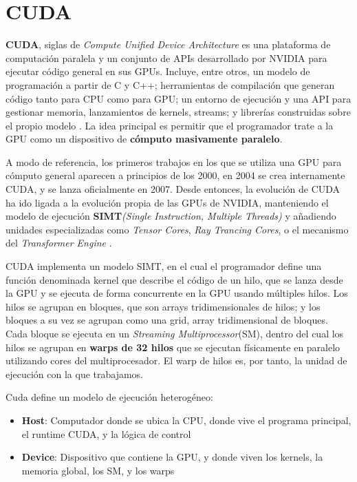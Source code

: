 \section{CUDA}

\textbf{CUDA}, siglas de \textit{Compute Unified Device Architecture} es una plataforma de computación paralela y un conjunto de APIs desarrollado por NVIDIA para ejecutar código general en sus GPUs. Incluye, entre otros, un modelo de programación a partir de C y C++; herramientas de compilación que generan código tanto para CPU como para GPU; un entorno de ejecución y una API para gestionar memoria, lanzamientos de kernels, streams; y librerías construidas sobre el propio modelo \cite{Kirk2010}. La idea principal es permitir que el programador trate a la GPU como un dispositivo de \textbf{cómputo masivamente paralelo}.

A modo de referencia, los primeros trabajos en los que se utiliza una GPU para cómputo general aparecen a principios de los 2000, en 2004 se crea internamente CUDA, y se lanza oficialmente en 2007. Desde entonces, la evolución de CUDA ha ido ligada a la evolución propia de las GPUs de NVIDIA, manteniendo el modelo de ejecución \textbf{SIMT}\textit{(Single Instruction, Multiple Threads)} y añadiendo unidades especializadas como \textit{Tensor Cores}, \textit{Ray Trancing Cores}, o el mecanismo del \textit{Transformer Engine} \cite{NVIDIA2026}.

CUDA implementa un modelo SIMT, en el cual el programador define una función denominada kernel que describe el código de un hilo, que se lanza desde la GPU y se ejecuta de forma concurrente en la GPU usando múltiples hilos. Los hilos se agrupan en bloques, que son arrays tridimensionales de hilos; y los bloques a su vez se agrupan como una grid, array tridimensional de bloques. Cada bloque se ejecuta en un \textit{Streaming Multiprocessor}(SM), dentro del cual los hilos se agrupan en \textbf{warps de 32 hilos} que se ejecutan físicamente en paralelo utilizando cores del multiprocesador. \cite{Kirk2010} El warp de hilos es, por tanto, la unidad de ejecución con la que trabajamos.

Cuda define un modelo de ejecución heterogéneo:
\begin{itemize}
	\item \textbf{Host}: Computador donde se ubica la CPU, donde vive el programa principal, el runtime CUDA, y la lógica de control
	\item \textbf{Device}: Dispositivo que contiene la GPU, y donde viven los kernels, la memoria global, los SM, y los warps
\end{itemize}

